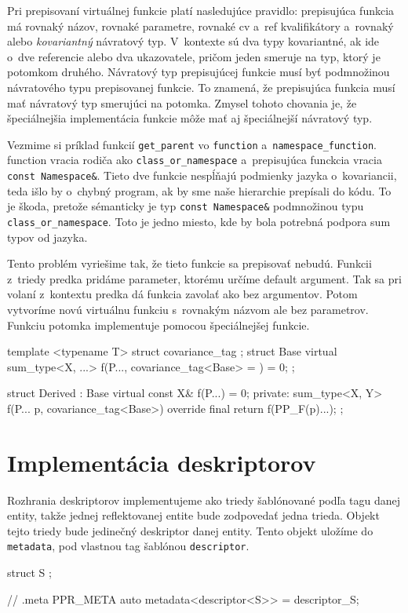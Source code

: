 Pri prepisovaní virtuálnej funkcie platí nasledujúce pravidlo: prepisujúca funk\-cia má rovnaký názov, rovnaké parametre, rovnaké cv a~ref kvalifikátory a~rovnaký alebo \emph{kovariantný} návratový typ. V~kontexte \Cpp{} sú dva typy kovariantné, ak ide o~dve referencie alebo dva ukazovatele, pričom jeden smeruje na typ, ktorý je potomkom druhého. Návratový typ prepisujúcej funkcie musí byť podmnožinou návratového typu prepisovanej funkcie. To znamená, že prepisujúca funkcia musí mať návratový typ smerujúci na potomka. Zmysel tohoto chovania je, že špeciálnejšia implementácia funkcie môže mať aj špeciálnejší návratový typ.

Vezmime si príklad funkcií \texttt{get\_parent} vo \texttt{function} a~\texttt{namespace\_function}. function vracia rodiča ako \texttt{class\_or\_namespace} a~prepisujúca funckcia vracia \texttt{const Namespace\&}. Tieto dve funkcie nespĺňajú podmienky jazyka o~kovariancii, teda išlo by o~chybný program, ak by sme naše hierarchie prepísali do kódu. To je škoda, pretože sémanticky je typ \texttt{const Namespace\&} podmnožinou typu \texttt{class\_or\_namespace}. Toto je jedno miesto, kde by bola potrebná podpora sum typov od jazyka.

Tento problém vyriešime tak, že tieto funkcie sa prepisovať nebudú. Funkcii z~triedy predka pridáme parameter, ktorému určíme default argument. Tak sa pri volaní z~kontextu predka dá funkcia zavolať ako bez argumentov. Potom vytvoríme novú virtuálnu funkciu s~rovnakým názvom ale bez parametrov. Funkciu potomka implementuje pomocou špeciálnejšej funkcie.
\begin{code}
template <typename T> struct covariance_tag {};
struct Base
{   virtual sum_type<X, ...> f(P..., covariance_tag<Base> = {}) = 0;
};

struct Derived : Base
{   virtual const X& f(P...) = 0;
private:
    sum_type<X, Y> f(P... p, covariance_tag<Base>) override final
    { return f(PP_F(p)...); }
};
\end{code}

\section{Implementácia deskriptorov}

Rozhrania deskriptorov implementujeme ako triedy šablónované podľa tagu danej entity, takže jednej reflektovanej entite bude zodpovedať jedna trieda. Objekt tejto triedy bude jedinečný deskriptor danej entity. Tento objekt uložíme do \texttt{metadata}, pod vlastnou tag šablónou \texttt{descriptor}.
\begin{code}
struct S {};

// .meta
PPR_META auto metadata<descriptor<S>> = descriptor_S{};
\end{code}

